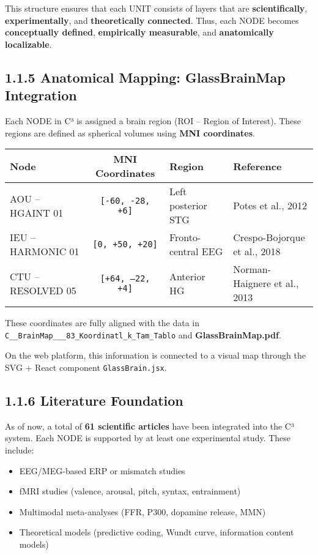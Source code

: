 This structure ensures that each UNIT consists of layers that are \textbf{scientifically}, \textbf{experimentally}, and \textbf{theoretically connected}. Thus, each NODE becomes \textbf{conceptually defined}, \textbf{empirically measurable}, and \textbf{anatomically localizable}.

\subsection*{1.1.5 Anatomical Mapping: GlassBrainMap Integration}

Each NODE in C³ is assigned a brain region (ROI – Region of Interest). These regions are defined as spherical volumes using \textbf{MNI coordinates}.

\begin{center}
\begin{tabular}{|l|c|l|l|}
\hline
\textbf{Node} & \textbf{MNI Coordinates} & \textbf{Region} & \textbf{Reference} \\
\hline
AOU – HGAINT 01 & \texttt{[-60, -28, +6]} & Left posterior STG & Potes et al., 2012 \\
IEU – HARMONIC 01 & \texttt{[0, +50, +20]} & Fronto-central EEG & Crespo-Bojorque et al., 2018 \\
CTU – RESOLVED 05 & \texttt{[+64, –22, +4]} & Anterior HG & Norman-Haignere et al., 2013 \\
\hline
\end{tabular}
\end{center}

These coordinates are fully aligned with the data in \texttt{C\_\_BrainMap\_\_\_83\_Koordinatl\_k\_Tam\_Tablo} and \textbf{GlassBrainMap.pdf}.

On the web platform, this information is connected to a visual map through the SVG + React component \texttt{GlassBrain.jsx}.

\subsection*{1.1.6 Literature Foundation}

As of now, a total of \textbf{61 scientific articles} have been integrated into the C³ system. Each NODE is supported by at least one experimental study. These include:

\begin{itemize}
    \item EEG/MEG-based ERP or mismatch studies
    \item fMRI studies (valence, arousal, pitch, syntax, entrainment)
    \item Multimodal meta-analyses (FFR, P300, dopamine release, MMN)
    \item Theoretical models (predictive coding, Wundt curve, information content models)
\end{itemize}

